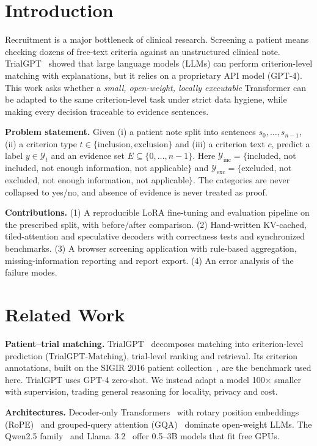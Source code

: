 \documentclass[conference]{IEEEtran}
\begin{document}
\section{Introduction}
Recruitment is a major bottleneck of clinical research. Screening a patient means checking
dozens of free-text criteria against an unstructured clinical note. TrialGPT~\cite{jin2024trialgpt}
showed that large language models (LLMs) can perform criterion-level matching with
explanations, but it relies on a proprietary API model (GPT-4). This work asks whether a
\emph{small, open-weight, locally executable} Transformer can be adapted to the same
criterion-level task under strict data hygiene, while making every decision traceable to
evidence sentences.

\textbf{Problem statement.} Given (i) a patient note split into sentences $s_0,\dots,s_{n-1}$,
(ii) a criterion type $t\in\{\text{inclusion},\text{exclusion}\}$ and (iii) a criterion text $c$,
predict a label $y\in\mathcal{Y}_t$ and an evidence set $E\subseteq\{0,\dots,n-1\}$. Here
$\mathcal{Y}_{\text{inc}}=\{$included, not included, not enough information, not applicable$\}$ and
$\mathcal{Y}_{\text{exc}}=\{$excluded, not excluded, not enough information, not applicable$\}$.
The categories are never collapsed to yes/no, and absence of evidence is never treated as proof.

\textbf{Contributions.} (1) A reproducible LoRA fine-tuning and evaluation pipeline on the
prescribed split, with before/after comparison. (2) Hand-written KV-cached, tiled-attention
and speculative decoders with correctness tests and synchronized benchmarks. (3) A browser
screening application with rule-based aggregation, missing-information reporting and report
export. (4) An error analysis of the failure modes.

\section{Related Work}
\textbf{Patient--trial matching.} TrialGPT~\cite{jin2024trialgpt} decomposes matching into
criterion-level prediction (TrialGPT-Matching), trial-level ranking and retrieval. Its
criterion annotations, built on the SIGIR 2016 patient collection~\cite{koopman2016test}, are the
benchmark used here. TrialGPT uses GPT-4 zero-shot. We instead adapt a model 100$\times$ smaller
with supervision, trading general reasoning for locality, privacy and cost.

\textbf{Architectures.} Decoder-only Transformers~\cite{vaswani2017attention} with rotary position
embeddings (RoPE)~\cite{su2024roformer} and grouped-query attention (GQA)~\cite{ainslie2023gqa}
dominate open-weight LLMs. The Qwen2.5 family~\cite{qwen2025} and Llama~3.2~\cite{grattafiori2024llama}
offer 0.5--3B models that fit free GPUs.
\end{document}
